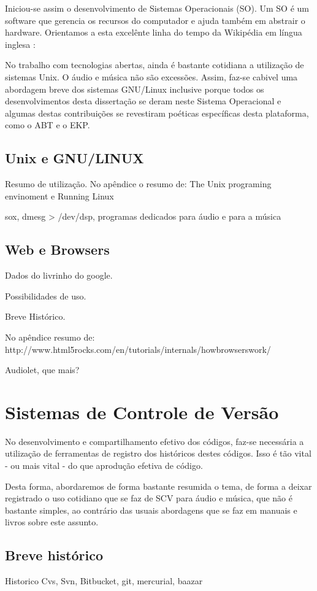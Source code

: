 Iniciou-se assim o desenvolvimento de Sistemas Operacionais (SO).
Um SO é um software que gerencia os recursos do computador e ajuda
também em abstrair o hardware. Orientamos a esta excelênte linha do
tempo da Wikipédia em língua inglesa \cite{solinhadotempo}:

No trabalho com tecnologias abertas, ainda é bastante cotidiana
a utilização de sistemas Unix. O áudio e música não são excessões.
Assim, faz-se cabivel uma abordagem breve dos sistemas GNU/Linux
inclusive porque todos os desenvolvimentos desta dissertação se deram
neste Sistema Operacional e algumas destas contribuições se revestiram
poéticas específicas desta plataforma, como o ABT e o EKP.

\subsection{Unix e GNU/LINUX}
Resumo de utilização. No apêndice o resumo de:
The Unix programing envinoment
e
Running Linux

sox, dmesg > /dev/dsp, programas dedicados para áudio e para a música

\subsection{Web e Browsers}

Dados do livrinho do google.

Possibilidades de uso.

Breve Histórico.

No apêndice resumo de:
http://www.html5rocks.com/en/tutorials/internals/howbrowserswork/

Audiolet, que mais?

\section{Sistemas de Controle de Versão}
No desenvolvimento e compartilhamento efetivo dos códigos, faz-se
necessária a utilização de ferramentas de registro dos históricos destes
códigos. Isso é tão vital - ou mais vital - do que aprodução efetiva de código.

Desta forma, abordaremos de forma bastante resumida o tema, de forma a deixar
registrado o uso cotidiano que se faz de SCV para áudio e música, que não
é bastante simples, ao contrário das usuais abordagens que se faz em manuais e livros
sobre este assunto.

\subsection{Breve histórico}
Historico Cvs, Svn, Bitbucket, git, mercurial, baazar

